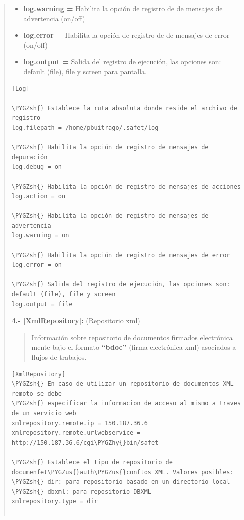 \documentclass[letterpaper,11pt,spanish]{sphinxmanual}
\def\PYGZus{\char`\_}
\def\PYGZsh{\char`\#}
\def\PYGZhy{\char`\-}
\begin{document}
\begin{quote}
\begin{itemize}
\item {} 
\textbf{log.warning =} Habilita la opción de registro de de mensajes de advertencia  (on/off)

\item {} 
\textbf{log.error =} Habilita la opción de registro de de mensajes de error (on/off)

\item {} 
\textbf{log.output =} Salida del registro de ejecución, las opciones son: default (file), file y screen para pantalla.

\end{itemize}

\begin{Verbatim}[commandchars=\\\{\}]
[Log]

\PYGZsh{} Establece la ruta absoluta donde reside el archivo de registro
log.filepath = /home/pbuitrago/.safet/log

\PYGZsh{} Habilita la opción de registro de mensajes de depuración
log.debug = on

\PYGZsh{} Habilita la opción de registro de mensajes de acciones
log.action = on

\PYGZsh{} Habilita la opción de registro de mensajes de advertencia
log.warning = on

\PYGZsh{} Habilita la opción de registro de mensajes de error
log.error = on

\PYGZsh{} Salida del registro de ejecución, las opciones son: default (file), file y screen
log.output = file
\end{Verbatim}

\textbf{4.- {[}XmlRepository{]}:} (Repositorio xml)
\begin{quote}

Información sobre repositorio de documentos firmados electrónica mente bajo el formato \textbf{``bdoc''} (firma electrónica xml) asociados a flujos de trabajos.
\end{quote}

\begin{Verbatim}[commandchars=\\\{\}]
[XmlRepository]
\PYGZsh{} En caso de utilizar un repositorio de documentos XML remoto se debe
\PYGZsh{} especificar la informacion de acceso al mismo a traves de un servicio web
xmlrepository.remote.ip = 150.187.36.6
xmlrepository.remote.urlwebservice = http://150.187.36.6/cgi\PYGZhy{}bin/safet

\PYGZsh{} Establece el tipo de repositorio de documenfet\PYGZus{}auth\PYGZus{}conftos XML. Valores posibles:
\PYGZsh{} dir: para repositorio basado en un directorio local
\PYGZsh{} dbxml: para repositorio DBXML
xmlrepository.type = dir


\end{Verbatim}
\end{quote}
\end{document}
